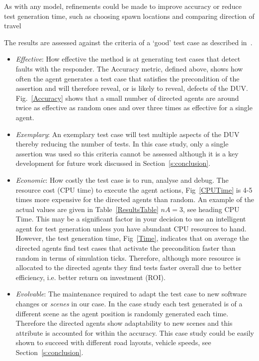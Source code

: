 \documentclass[letterpaper, 10 pt, journal, twoside]{IEEEtran}
\begin{document}
As with any model, refinements could be made to improve accuracy or reduce test generation time, such as choosing spawn locations and comparing direction of travel %

The results are assessed against the criteria of a `good' test case as described in~\cite{fewster1999software}.
\begin{itemize}
	\item \textit{Effective}: How effective the method is at generating test cases that detect faults with the responder. The Accuracy metric, defined above, shows how often the agent generates a test case that satisfies the precondition of the assertion and will therefore reveal, or is likely to reveal, defects of the DUV. Fig.~\ref{Accuracy} shows that a small number of directed agents are around twice as effective as random ones and over three times as effective for a single agent.
	\item \textit{Exemplary}: An exemplary test case will test multiple aspects of the DUV thereby reducing the number of tests. In this case study, only a single assertion was used so this criteria cannot be assessed although it is a key development for future work discussed in Section~\ref{s:conclusion}.
	\item \textit{Economic}: How costly the test case is to run, analyse and debug. The resource cost (CPU time) to execute the agent actions, Fig~\ref{CPUTime} is 4-5 times more expensive for the directed agents than random. An example of the actual values are given in Table~\ref{ResultsTable} $nA=3$, see heading CPU Time. This may be a significant factor in your decision to use an intelligent agent for test generation unless you have abundant CPU resources to hand. %
	However, the test generation time, Fig~\ref{Time}, indicates that on average the directed agents find test cases that activate the precondition faster than random in terms of simulation ticks. Therefore, although more resource is allocated to the directed agents they find tests faster overall due to better efficiency, i.e. better return on investment (ROI).
	\item \textit{Evolvable}: The maintenance required to adapt the test case to new software changes or \textit{scenes} in our case. In the case study each test generated is of a different scene as the agent position is randomly generated each time. Therefore the directed agents show adaptability to new scenes and this attribute is accounted for within the accuracy. This case study could be easily shown to succeed with different road layouts, vehicle speeds, see Section~\ref{s:conclusion}.
\end{itemize}
\end{document}
